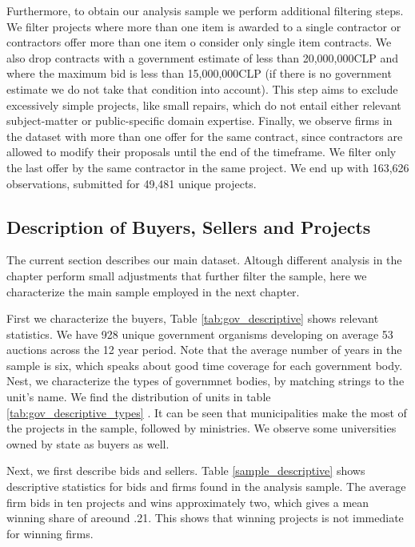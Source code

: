 Furthermore, to obtain our analysis sample we perform additional filtering steps. We filter projects where more than one item is awarded to a single contractor or contractors offer more than one item o consider only single item contracts. We also drop contracts with a government estimate of less than 20,000,000CLP and where the maximum bid is less than 15,000,000CLP (if there is no government estimate we do not take that condition into account).
This step aims to exclude excessively simple projects, like small repairs, which do not entail either relevant subject-matter or public-specific domain expertise. Finally, we observe firms in the dataset with more than one offer for the same contract, since contractors are allowed to modify their proposals until the end of the timeframe. We filter only the last offer by the same contractor in the same project.  We end up with 163,626 observations, submitted for 49,481 unique projects.

\subsection{Description of Buyers, Sellers and Projects}
The current section describes our main dataset. Altough different analysis in the chapter perform small adjustments that further filter the sample, here we characterize the main sample employed in the next chapter.

First we characterize the buyers, Table \ref{tab:gov_descriptive} shows relevant statistics. We have 928 unique government organisms developing on average 53 auctions across the 12 year period. Note that the average number of years in the sample is six, which speaks about good time coverage for each government body. Nest, we characterize the types of governmnet bodies, by matching strings to the unit's name. We find the distribution of units in table \ref{tab:gov_descriptive_types} . It can be seen that municipalities make the most of the projects in the sample, followed by ministries. We observe some universities owned by state as buyers as well.




Next, we first describe bids and sellers. Table \ref{sample_descriptive} shows descriptive statistics for bids and firms found in the analysis sample. The average firm bids in ten projects and wins approximately two, which gives a mean winning share of areound .21. This shows that winning projects is not immediate for winning firms.

